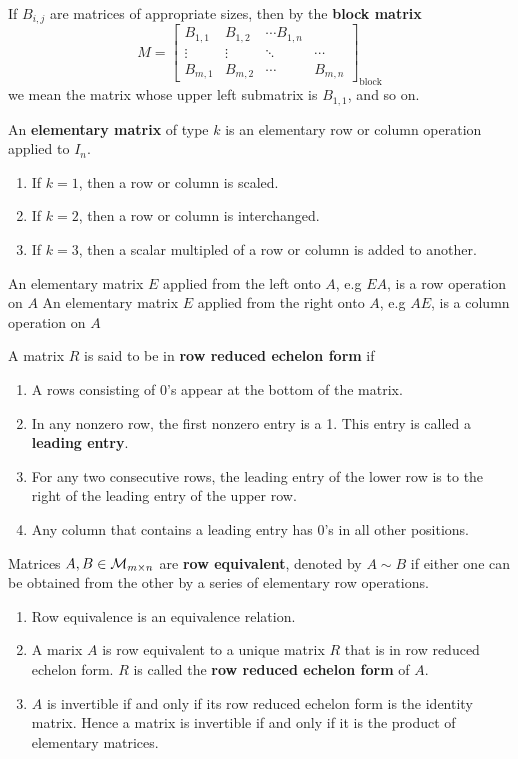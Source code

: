 \begin{definition}
If $B_{i,j}$ are matrices of appropriate sizes, then by the \textbf{block matrix}
\[M=\begin{bmatrix}
B_{1,1} & B_{1,2} & \cdots B_{1,n}\\
\vdots & \vdots & \ddots & \cdots\\
B_{m,1} & B_{m,2} & \cdots & B_{m,n}
\end{bmatrix}_{\text{block}}\]
we mean the matrix whose upper left submatrix is $B_{1,1}$, and so on.
\end{definition}

\begin{definition}
An \textbf{elementary matrix} of type $k$ is an elementary row or column operation applied to $I_n$. 
\begin{enumerate}[label=\arabic*)]
\item If $k=1$, then a row or column is scaled.
\item If $k=2$, then a row or column is interchanged.
\item If $k=3$, then a scalar multipled of a row or column is added to another.
\end{enumerate}
\end{definition}
An elementary matrix $E$ applied from the left onto $A$, e.g $EA$, is a row operation on $A$ An elementary matrix $E$ applied from the right onto $A$, e.g $AE$, is a column operation on $A$

\begin{definition}
A matrix $R$ is said to be in \textbf{row reduced echelon form} if
\begin{enumerate}
\item A rows consisting of 0's appear at the bottom of the matrix.
\item In any nonzero row, the first nonzero entry is a 1. This entry is called a  \textbf{leading entry}.
\item For any two consecutive rows, the leading entry of the lower row is to the right of the leading entry of the upper row.
\item Any column that contains a leading entry has 0's in all other positions.
\end{enumerate}
\end{definition}

\begin{theorem}
Matrices $A,B\in {\mathcal{M}}_{m\times n}$ are \textbf{row equivalent}, denoted by $A\sim B$ if either one can be obtained from the other by a series of elementary row operations.
\begin{enumerate}
\item Row equivalence is an equivalence relation.
\item A marix $A$ is row equivalent to a unique matrix $R$ that is in row reduced echelon form. $R$ is called the \textbf{row reduced echelon form} of $A$.
\item $A$ is invertible if and only if its row reduced echelon form is the identity matrix. Hence a matrix is invertible if and only if it is the product of elementary matrices.
\end{enumerate}
\end{theorem}

